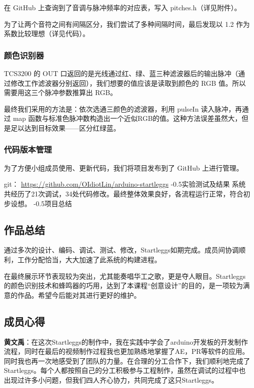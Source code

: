 \documentclass[a4paper,12pt]{ctexart}
\makeatletter
\newcommand{\sectionfontsize}{\fontsize{15pt}{18pt}\selectfont}
\renewcommand{\section}{\@startsection{section}{1}{0mm}
		{-\baselineskip}{0.5\baselineskip}{\sectionfontsize\bf\leftline}}
\makeatother
\begin{document}
				在 GitHub 上查询到了音调与脉冲频率的对应表，写入 pitches.h（详见附件）。
				
				为了让两个音符之间有间隔区分，我们尝试了多种间隔时间，最后发现以 1.2 作为系数比较理想（详见代码）。
			\subsubsection{颜色识别器}
				TCS3200 的 OUT 口返回的是光线通过红、绿、蓝三种滤波器后的输出脉冲（通过修改工作滤波器分别返回），我们想要的值应该是读取到颜色的 RGB 值。所以需要用这三个脉冲参数推算出 RGB。
				
				最终我们采用的方法是：依次选通三颜色的滤波器，利用 pulseIn 读入脉冲，再通过 map 函数与标准色脉冲数构造出一个近似RGB的值。这种方法误差虽然大，但是足以达到目标效果——区分红绿蓝。
			\subsubsection{代码版本管理}
				为了方便小组成员使用、更新代码，我们将项目发布到了 GitHub 上进行管理。
				
				git： \href{https://github.com/OIdiotLin/arduino-startleggs}{https://github.com/OIdiotLin/arduino-startleggs}
	\section{实验测试及结果}
		系统共经历了21次调试，34处代码修改。最终整体效果良好，各流程运行正常，符合初步设想。
	\section{项目总结}
		\subsection{作品总结}
			通过多次的设计、编码、调试、测试、修改，Startleggs如期完成。成员间协调顺利，工作分配恰当，大大加速了此系统的构建进程。
			
			在最终展示环节表现较为突出，尤其能奏唱华工之歌，更是夺人眼目。Startleggs的颜色识别技术和蜂鸣器的巧用，达到了本课程“创意设计”的目的，是一项较为满意的作品。希望今后能对其进行更好的维护。
		\subsection{成员心得}
			\textbf{黄文禹}：在这次Startleggs的制作中，我在实践中学会了arduino开发板的开发制作流程，同时在最后的视频制作过程我也更加熟练地掌握了AE，PR等软件的应用。同时我也再一次地感受到了团队的力量。在合理的分工合作下，我们顺利地完成了Startleggs。每个人都按照自己的分工积极参与工程制作，虽然在调试的过程中也出现过许多小问题，但我们四人齐心协力，共同完成了这只Startleggs。
			
\end{document}

